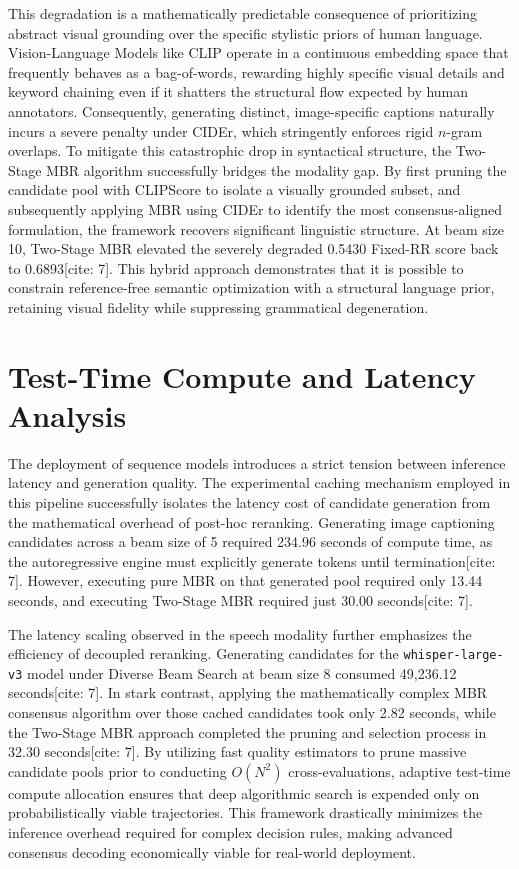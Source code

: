 This degradation is a mathematically predictable consequence of prioritizing abstract visual grounding over the specific stylistic priors of human language. Vision-Language Models like CLIP operate in a continuous embedding space that frequently behaves as a bag-of-words, rewarding highly specific visual details and keyword chaining even if it shatters the structural flow expected by human annotators. Consequently, generating distinct, image-specific captions naturally incurs a severe penalty under CIDEr, which stringently enforces rigid $n$-gram overlaps. To mitigate this catastrophic drop in syntactical structure, the Two-Stage MBR algorithm successfully bridges the modality gap. By first pruning the candidate pool with CLIPScore to isolate a visually grounded subset, and subsequently applying MBR using CIDEr to identify the most consensus-aligned formulation, the framework recovers significant linguistic structure. At beam size 10, Two-Stage MBR elevated the severely degraded 0.5430 Fixed-RR score back to 0.6893[cite: 7]. This hybrid approach demonstrates that it is possible to constrain reference-free semantic optimization with a structural language prior, retaining visual fidelity while suppressing grammatical degeneration.

\section{Test-Time Compute and Latency Analysis}
\label{sec:test_time_scaling}

The deployment of sequence models introduces a strict tension between inference latency and generation quality. The experimental caching mechanism employed in this pipeline successfully isolates the latency cost of candidate generation from the mathematical overhead of post-hoc reranking. Generating image captioning candidates across a beam size of 5 required 234.96 seconds of compute time, as the autoregressive engine must explicitly generate tokens until termination[cite: 7]. However, executing pure MBR on that generated pool required only 13.44 seconds, and executing Two-Stage MBR required just 30.00 seconds[cite: 7]. 

The latency scaling observed in the speech modality further emphasizes the efficiency of decoupled reranking. Generating candidates for the \texttt{whisper-large-v3} model under Diverse Beam Search at beam size 8 consumed 49,236.12 seconds[cite: 7]. In stark contrast, applying the mathematically complex MBR consensus algorithm over those cached candidates took only 2.82 seconds, while the Two-Stage MBR approach completed the pruning and selection process in 32.30 seconds[cite: 7]. By utilizing fast quality estimators to prune massive candidate pools prior to conducting $O(N^2)$ cross-evaluations, adaptive test-time compute allocation ensures that deep algorithmic search is expended only on probabilistically viable trajectories. This framework drastically minimizes the inference overhead required for complex decision rules, making advanced consensus decoding economically viable for real-world deployment.

